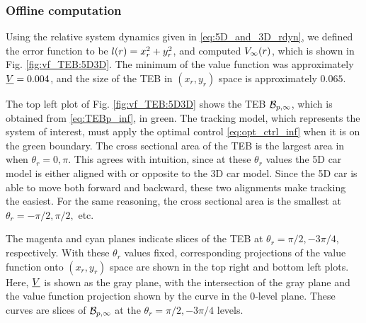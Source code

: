 \subsubsection{Offline computation}

Using the relative system dynamics given in \eqref{eq:5D_and_3D_rdyn}, we defined the error function to be $l(r) = x_r^2 + y_r^2$, and computed $V_\infty(r)$, which is shown in Fig. \ref{fig:vf_TEB:5D3D}.
The minimum of the value function was approximately $\underline{V} = 0.004$, and the size of the TEB in $(x_r, y_r)$ space is approximately $0.065$.

The top left plot of Fig. \ref{fig:vf_TEB:5D3D} shows the TEB $\mathcal B_{p, \infty}$, which is obtained from \eqref{eq:TEBp_inf}, in green.
The tracking model, which represents the system of interest, must apply the optimal control \eqref{eq:opt_ctrl_inf} when it is on the green boundary.
The cross sectional area of the TEB is the largest area in when $\theta_r = 0,\pi$. 
This agrees with intuition, since at these $\theta_r$ values the 5D car model is either aligned with or opposite to the 3D car model.
Since the 5D car is able to move both forward and backward, these two alignments make tracking the easiest.
For the same reasoning, the cross sectional area is the smallest at $\theta_r = -\pi/2, \pi/2,$ etc.

The magenta and cyan planes indicate slices of the TEB at $\theta_r = \pi/2, -3\pi/4$, respectively.
With these $\theta_r$ values fixed, corresponding projections of the value function onto $(x_r, y_r)$ space are shown in the top right and bottom left plots.
Here, $\underline{V}$ is shown as the gray plane, with the intersection of the gray plane and the value function projection shown by the curve in the $0$-level plane. 
These curves are slices of $\mathcal B_{p, \infty}$ at the $\theta_r = \pi/2, -3\pi/4$ levels.

